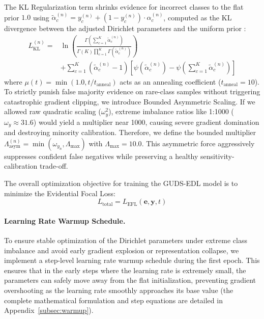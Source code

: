 \documentclass[letterpaper]{article} %
\begin{document}
The KL Regularization term shrinks evidence for incorrect classes to the flat prior $1.0$ using $\tilde{\alpha}_c^{(n)} = y_c^{(n)} + (1 - y_c^{(n)}) \cdot \alpha_c^{(n)}$, computed as the KL divergence between the adjusted Dirichlet parameters and the uniform prior \cite{sensoy2018evidential}:
\begin{equation}\label{eq:kl_loss_n}
\begin{aligned}
    L_{\text{KL}}^{(n)} ={}& \ln \left( \frac{\Gamma\left(\sum_{c=1}^K \tilde{\alpha}_c^{(n)}\right)}{\Gamma(K) \prod_{c=1}^K \Gamma(\tilde{\alpha}_c^{(n)})} \right) \\
    &+ \sum_{c=1}^K (\tilde{\alpha}_c^{(n)} - 1)\left[\psi(\tilde{\alpha}_c^{(n)}) - \psi\!\left(\sum_{c=1}^K \tilde{\alpha}_c^{(n)}\right)\right]
\end{aligned}
\end{equation}
where $\mu(t) = \min(1.0, t / t_{\text{anneal}})$ acts as an annealing coefficient ($t_{\text{anneal}} = 10$). To strictly punish false majority evidence on rare-class samples without triggering catastrophic gradient clipping, we introduce Bounded Asymmetric Scaling. If we allowed raw quadratic scaling ($\omega_y^2$), extreme imbalance ratios like 1:1000 ($\omega_y \approx 31.6$) would yield a multiplier near 1000, causing severe gradient domination and destroying minority calibration. Therefore, we define the bounded multiplier $\Lambda_{\text{asym}}^{(n)} = \min(\omega_{y_n}, \Lambda_{\text{max}})$ with $\Lambda_{\text{max}} = 10.0$. This asymmetric force aggressively suppresses confident false negatives while preserving a healthy sensitivity-calibration trade-off.

The overall optimization objective for training the GUDS-EDL model is to minimize the Evidential Focal Loss:
\begin{equation}\label{eq:total_loss}
    L_{\text{total}} = L_{\text{EFL}}(\bm{e}, \bm{y}, t)
\end{equation}

\paragraph{Learning Rate Warmup Schedule.}
To ensure stable optimization of the Dirichlet parameters under extreme class imbalance and avoid early gradient explosion or representation collapse, we implement a step-level learning rate warmup schedule during the first epoch. This ensures that in the early steps where the learning rate is extremely small, the parameters can safely move away from the flat initialization, preventing gradient overshooting as the learning rate smoothly approaches its base value (the complete mathematical formulation and step equations are detailed in Appendix~\ref{subsec:warmup}).
\end{document}
